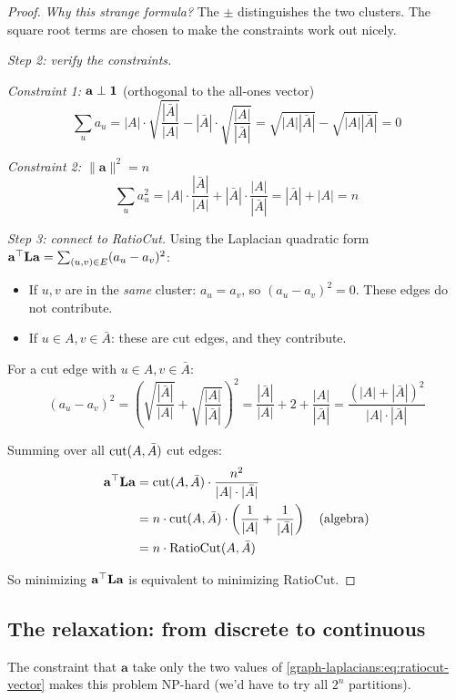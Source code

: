 \begin{notechapter}
\begin{proof}
\emph{Why this strange formula?} The $\pm$ distinguishes the two clusters. The square root terms are chosen to make the constraints work out nicely.

\emph{Step 2: verify the constraints.}

\emph{Constraint 1: $\mathbf{a} \perp \mathbf{1}$} (orthogonal to the all-ones vector)
\[
\sum_{u} a_u = |A| \cdot \sqrt{\frac{|\bar{A}|}{|A|}} - |\bar{A}| \cdot \sqrt{\frac{|A|}{|\bar{A}|}} = \sqrt{|A||\bar{A}|} - \sqrt{|A||\bar{A}|} = 0
\]

\emph{Constraint 2: $\|\mathbf{a}\|^2 = n$}
\[
\sum_{u} a_u^2 = |A| \cdot \frac{|\bar{A}|}{|A|} + |\bar{A}| \cdot \frac{|A|}{|\bar{A}|} = |\bar{A}| + |A| = n
\]

\emph{Step 3: connect to RatioCut.}
Using the Laplacian quadratic form $\mathbf{a}^\top \mathbf{L} \mathbf{a} = \sum_{(u,v) \in E} (a_u - a_v)^2$:
\begin{itemize}
    \item If $u, v$ are in the \emph{same} cluster: $a_u = a_v$, so $(a_u - a_v)^2 = 0$. These edges do not contribute.
    \item If $u \in A, v \in \bar{A}$: these are cut edges, and they contribute.
\end{itemize}

For a cut edge with $u \in A, v \in \bar{A}$:
\[
(a_u - a_v)^2 = \left( \sqrt{\frac{|\bar{A}|}{|A|}} + \sqrt{\frac{|A|}{|\bar{A}|}} \right)^2 = \frac{|\bar{A}|}{|A|} + 2 + \frac{|A|}{|\bar{A}|} = \frac{(|A| + |\bar{A}|)^2}{|A| \cdot |\bar{A}|}
\]

Summing over all $\mathrm{cut}(A, \bar{A})$ cut edges:
\begin{align}
\mathbf{a}^\top \mathbf{L} \mathbf{a} &= \mathrm{cut}(A, \bar{A}) \cdot \frac{n^2}{|A| \cdot |\bar{A}|} \\
&= n \cdot \mathrm{cut}(A, \bar{A}) \cdot \left( \frac{1}{|A|} + \frac{1}{|\bar{A}|} \right) \quad \text{(algebra)} \\
&= n \cdot \text{RatioCut}(A, \bar{A})
\end{align}

So minimizing $\mathbf{a}^\top \mathbf{L} \mathbf{a}$ is equivalent to minimizing RatioCut.
\end{proof}

\subsection{The relaxation: from discrete to continuous}

\begin{keyidea}
The constraint that $\mathbf{a}$ take only the two values of \eqref{graph-laplacians:eq:ratiocut-vector} makes this problem NP-hard (we'd have to try all $2^n$ partitions).


\end{keyidea}
\end{notechapter}
